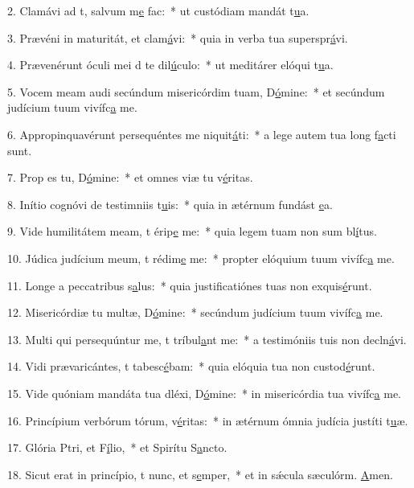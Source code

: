 2. Clamávi ad t, salvum m\uline{e} fac:~* ut custódiam mandát t\uline{u}a.\par 
3. Prævéni in maturitát, et clam\uline{á}vi:~* quia in verba tua superspr\uline{á}vi.\par 
4. Prævenérunt óculi mei d te dil\uline{ú}culo:~* ut meditárer elóqui t\uline{u}a.\par 
5. Vocem meam audi secúndum misericórdim tuam, D\uline{ó}mine:~* et secúndum judícium tuum vivífc\uline{a} me.\par 
6. Appropinquavérunt persequéntes me niquit\uline{á}ti:~* a lege autem tua long f\uline{a}cti sunt.\par 
7. Prop es tu, D\uline{ó}mine:~* et omnes viæ tu v\uline{é}ritas.\par 
8. Inítio cognóvi de testimniis t\uline{u}is:~* quia in ætérnum fundást \uline{e}a.\par 
9. Vide humilitátem meam, t érip\uline{e} me:~* quia legem tuam non sum bl\uline{í}tus.\par 
10. Júdica judícium meum, t rédim\uline{e} me:~* propter elóquium tuum vivífc\uline{a} me.\par 
11. Longe a peccatribus s\uline{a}lus:~* quia justificatiónes tuas non exquis\uline{é}runt.\par 
12. Misericórdiæ tu multæ, D\uline{ó}mine:~* secúndum judícium tuum vivífc\uline{a} me.\par 
13. Multi qui persequúntur me, t tríbul\uline{a}nt me:~* a testimóniis tuis non decln\uline{á}vi.\par 
14. Vidi prævaricántes, t tabesc\uline{é}bam:~* quia elóquia tua non custod\uline{é}runt.\par 
15. Vide quóniam mandáta tua dléxi, D\uline{ó}mine:~* in misericórdia tua vivífc\uline{a} me.\par 
16. Princípium verbórum tórum, v\uline{é}ritas:~* in ætérnum ómnia judícia justíti t\uline{u}æ.\par 
17. Glória Ptri, et F\uline{í}lio,~* et Spirítu S\uline{a}ncto.\par 
18. Sicut erat in princípio, t nunc, et s\uline{e}mper,~* et in sǽcula sæculórm. \uline{A}men.\par 
